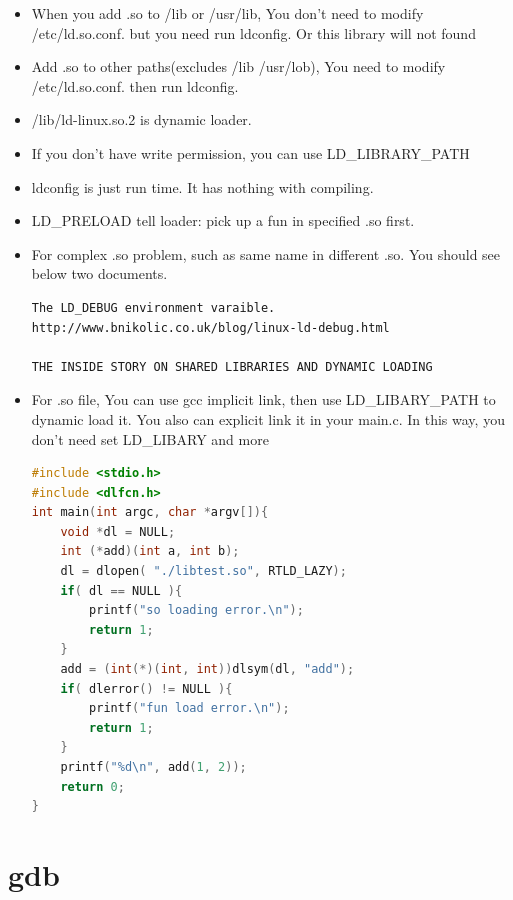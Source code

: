 \documentclass[a4paper,12pt,twoside]{book}
\begin{document}
\begin{itemize}
\begin{itemize}
				\item When you add .so to /lib or /usr/lib, You don't need to modify /etc/ld.so.conf. but you need run ldconfig.  Or this library will not found 

				\item Add .so to other paths(excludes /lib /usr/lob), You need to modify /etc/ld.so.conf. then run ldconfig. 
				\item /lib/ld-linux.so.2 is dynamic loader. 
				\item If you don't have write permission, you can use LD\_LIBRARY\_PATH

				\item ldconfig is just run time. It has nothing with compiling. 

				\item LD\_PRELOAD tell loader: pick up a fun in specified .so first. 
				\item For complex .so problem, such as same name in different .so.  You should see below two documents. 

\begin{verbatim}
The LD_DEBUG environment varaible.
http://www.bnikolic.co.uk/blog/linux-ld-debug.html	

THE INSIDE STORY ON SHARED LIBRARIES AND DYNAMIC LOADING			
\end{verbatim}			
  	 
		\item For .so file, You can use gcc implicit link, then use LD\_LIBARY\_PATH to dynamic load it. You also can explicit link it in your main.c. In this way, you don't need set LD\_LIBARY and more 

\begin{lstlisting}[frame=single, language=c++]
#include <stdio.h>
#include <dlfcn.h>
int main(int argc, char *argv[]){
	void *dl = NULL;
	int (*add)(int a, int b);
	dl = dlopen( "./libtest.so", RTLD_LAZY);
	if( dl == NULL ){
		printf("so loading error.\n");
		return 1;
	}
    add = (int(*)(int, int))dlsym(dl, "add");
	if( dlerror() != NULL ){
        printf("fun load error.\n");
		return 1;
	}
	printf("%d\n", add(1, 2));
	return 0;
}
\end{lstlisting}

 \end{itemize}


\section{gdb}

\end{itemize}
\end{document}
